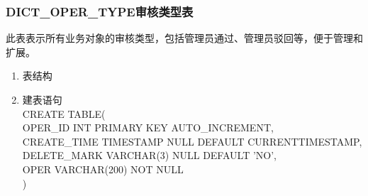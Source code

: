 \subsubsection{DICT\_OPER\_TYPE审核类型表}
此表表示所有业务对象的审核类型，包括管理员通过、管理员驳回等，便于管理和扩展。
\begin{enumerate}
    \item 表结构
    \begin{table}[htbp]
        \centering
        \end{table}
    \item 建表语句\\
        CREATE TABLE(\\
            OPER\_ID INT PRIMARY KEY AUTO\_INCREMENT,\\
            CREATE\_TIME TIMESTAMP NULL DEFAULT CURRENTTIMESTAMP,\\
            DELETE\_MARK VARCHAR(3) NULL DEFAULT 'NO',\\
            OPER VARCHAR(200) NOT NULL \\
        )
    \end{enumerate}


